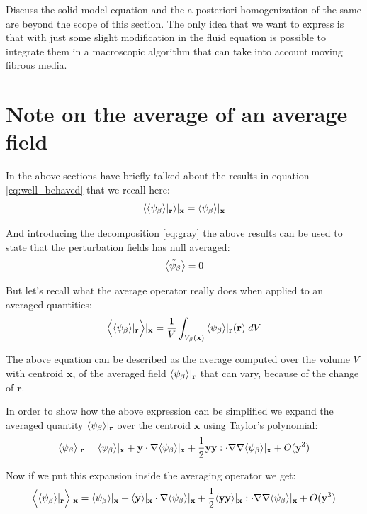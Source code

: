 Discuss the solid model equation and the a posteriori homogenization of the same are beyond the scope of this section.
The only idea that we want to express is that with just some slight modification in the fluid equation is possible to integrate them in a macroscopic algorithm that can take into account moving fibrous media.


\section{Note on the average of an average field}
\label{ch:appendix_a}

In the above sections have briefly talked about the results in equation \ref{eq:well_behaved} that we recall here:
$${\left< {\left< \psi_{\beta} \right>}|_{\mathbf{r}} \right>}|_{\mathbf{x}} = {\left< \psi_{\beta} \right>}|_{\mathbf{x}}$$

And introducing the decomposition \ref{eq:gray} the above results can be used to state that the perturbation fields has null averaged:
$$  {\left< \tilde{\psi}_{\beta} \right>} = 0 $$

But let's recall what the average operator really does when applied to an averaged quantities:
$$  \Big< {\left< \psi_{\beta} \right>}|_{\mathbf{r}} \Big>|_{\mathbf{x}}  = \dfrac{1}{V} \int_{V_\beta(\mathbf{x})} {\left< \psi_{\beta} \right>}|_{\mathbf{r}}(\mathbf{r}) \; dV $$

The above equation can be described as the average computed over the volume $V$ with centroid $\mathbf{x}$, of the averaged field ${\left< \psi_{\beta} \right>}|_{\mathbf{r}}$ that can vary, because of the change of $\mathbf{r}$.

In order to show how the above expression can be simplified we expand the averaged quantity ${\left< \psi_{\beta} \right>}|_{\mathbf{r}}$ over the centroid $\mathbf{x}$ using Taylor's polynomial:
$$
{\left< \psi_{\beta} \right>}|_{\mathbf{r}} = {\left< \psi_{\beta} \right>}|_{\mathbf{x}} + \mathbf{y} \cdot \nabla {\left< \psi_{\beta} \right>}|_{\mathbf{x}} + \dfrac{1}{2} \mathbf{y}\mathbf{y} : \cdot \nabla \nabla {\left< \psi_{\beta} \right>}|_{\mathbf{x}} + O(\mathbf{y}^3)
$$

Now if we put this expansion inside the averaging operator we get:
$$
\Big< {\left< \psi_{\beta} \right>}|_{\mathbf{r}} \Big>|_{\mathbf{x}} = {\left< \psi_{\beta} \right>}|_{\mathbf{x}} + {\left< \mathbf{y} \right>}|_{\mathbf{x}} \cdot \nabla {\left< \psi_{\beta} \right>}|_{\mathbf{x}} + \dfrac{1}{2} {\left< \mathbf{y}\mathbf{y} \right>}|_{\mathbf{x}} : \cdot \nabla \nabla {\left< \psi_{\beta} \right>}|_{\mathbf{x}} + O(\mathbf{y}^3)
$$


